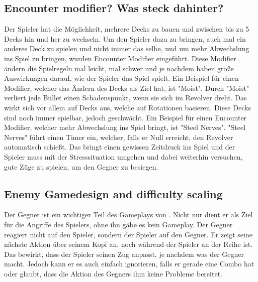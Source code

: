 \subsection{Encounter modifier? Was steck dahinter?}\label{subsec:placementMatters}

Der Spieler hat die Möglichkeit, mehrere Decks zu bauen und zwischen bis zu 5 Decks hin und her zu wechseln.
Um den Spieler dazu zu bringen, auch mal ein anderes Deck zu spielen und nicht immer das selbe, und um mehr
Abwechslung ins Spiel zu bringen, wurden Encounter Modifier eingeführt.
Diese Modifier ändern die Spielregeln mal leicht, mal schwer und je nachdem haben große Auswirkungen darauf, wie der Spieler das Spiel spielt.
Ein Beispiel für einen Modifier, welcher das Ändern des Decks als Ziel hat, ist "Moist". Durch "Moist" verliert jede Bullet einen Schadenspunkt, wenn sie sich im Revolver dreht.
Das wirkt sich vor allem auf Decks aus, welche auf Rotationen basieren. Diese Decks sind noch immer spielbar, jedoch geschwächt.
Ein Beispiel für einen Encounter Modifier, welcher mehr Abwechslung ins Spiel bringt, ist "Steel Nerves". "Steel Nerves" führt
einen Timer ein, welcher, falls er Null erreicht, den Revolver automatisch schießt. Das bringt einen gewissen Zeitdruck
ins Spiel und der Spieler muss mit der Stresssituation umgehen und dabei weiterhin versuchen, gute Züge zu spielen, um den Gegner zu besiegen. %

\subsection{Enemy Gamedesign and difficulty scaling}\label{subsec:placementMatters}

Der Gegner ist ein wichtiger Teil des Gameplays von \FF. Nicht nur dient er als Ziel für die Angriffe des Spielers, ohne ihn gäbe es kein Gameplay.
Der Gegner reagiert nicht auf den Spieler, sondern der Spieler auf den Gegner. Er zeigt seine nächste Aktion über seinem Kopf an, noch während der Spieler an der Reihe ist.
Das bewirkt, dass der Spieler seinen Zug anpasst, je nachdem was der Gegner macht. Jedoch kann er es auch einfach ignorieren,
falls er gerade eine Combo hat oder glaubt, dass die Aktion des Gegners ihm keine Probleme bereitet.


